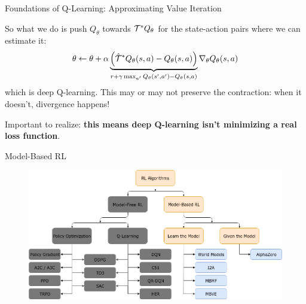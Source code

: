 \documentclass[9pt]{beamer}
\begin{document}
\begin{frame}{Foundations of Q-Learning: Approximating Value Iteration}

So what we do is push $Q_{\theta}$ towards ${\mathcal T}^* Q_{\theta}$ for the state-action pairs where we can estimate it:
%
\begin{equation*}
\theta \leftarrow \theta + \alpha \underbrace{\left(\hat{{\mathcal T}}^*Q_{\theta}(s,a) - Q_{\theta}(s,a)\right)}_{r + \gamma \max_{a'} Q_{\theta}(s',a') - Q_{\theta}(s,a)} \nabla_{\theta} Q_{\theta}(s,a)
\end{equation*}
%
which is deep Q-learning. This may or may not preserve the contraction: when it doesn't, divergence happens!

\vspace{2em}

Important to realize: \textbf{this means deep Q-learning isn't minimizing a real loss function}.

\end{frame}

\begin{frame}{Model-Based RL}
\begin{figure}
\centering
\includegraphics[width=\linewidth]{rl_algorithms_modelbased_only}
\end{figure}
\end{frame}
\end{document}
